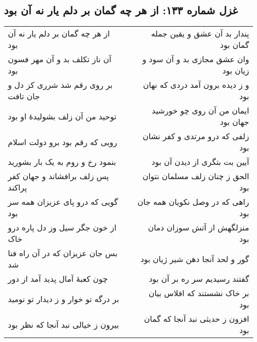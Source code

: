 \begin{center}
\section*{غزل شماره ۱۳۳: از هر چه گمان بر دلم یار نه آن بود}
\label{sec:133}
\begin{longtable}{l p{0.5cm} r}
از هر چه گمان بر دلم یار نه آن بود
&&
پندار بد آن عشق و یقین جمله گمان بود
\\
آن ناز تکلف بد و آن مهر فسون بود
&&
وان عشق مجازی بد و آن سود و زیان بود
\\
بر روی رقم شد شرری کز دل و جان تافت
&&
و ز دیده برون آمد دردی که نهان بود
\\
توحید من آن زلف بشولیدهٔ او بود
&&
ایمان من آن روی چو خورشید جهان بود
\\
رویی که رقم بود برو دولت اسلام
&&
زلفی که درو مرتدی و کفر نشان بود
\\
بنمود رخ و روم به یک بار بشورید
&&
آیین بت بتگری از دیدن آن بود
\\
پس زلف برافشاند و جهان کفر پراکند
&&
الحق ز چنان زلف مسلمان نتوان بود
\\
گویی که درو پای عزیزان همه سر بود
&&
راهی که در وصل نکویان همه جان بود
\\
از خون جگر سیل وز دل پاره درو خاک
&&
منزلگهش از آتش سوزان دمان بود
\\
بس جان عزیزان که در آن راه فنا شد
&&
گور و لحد آنجا دهن شیر ژیان بود
\\
چون کعبهٔ آمال پدید آمد از دور
&&
گفتند رسیدیم سر ره بر آن بود
\\
بر درگه تو خوار و ز دیدار تو نومید
&&
بر خاک نشستند که افلاس بیان بود
\\
بیرون ز خیالی نبد آنجا که نظر بود
&&
افزون ز حدیثی نبد آنجا که گمان بود
\\
\end{longtable}
\end{center}
